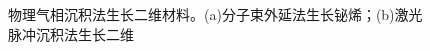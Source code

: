     \begin{figure}
        \caption{物理气相沉积法生长二维材料。(a)分子束外延法生长铋烯；(b)激光脉冲沉积法生长二维}
        \label{fig:intro_2DMS-growth-downUp}
    \end{figure}

